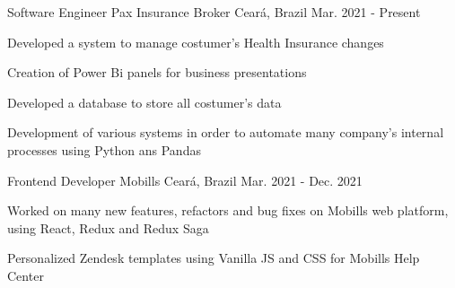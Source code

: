 

\begin{cventries}

  \cventry
    {Software Engineer} %
    {Pax Insurance Broker} %
    {Ceará, Brazil} %
    {Mar. 2021 - Present} %
    {
      \begin{cvitems} %
        \item {Developed a system to manage costumer's Health Insurance changes}
        \item {Creation of Power Bi panels for business presentations}
        \item {Developed a database to store
        all costumer's data}
        \item {Development of various systems in order to automate many company's internal processes using Python ans Pandas}
      \end{cvitems}
    }

  \cventry
    {Frontend Developer} %
    {Mobills} %
    {Ceará, Brazil} %
    {Mar. 2021 - Dec. 2021} %
    {
      \begin{cvitems} %
        \item {Worked on many new features,
        refactors and bug fixes on Mobills
        web platform, using React, Redux
        and Redux Saga}
        \item {Personalized Zendesk templates
        using Vanilla JS and CSS for
        Mobills Help Center}
      \end{cvitems}
    }

\end{cventries}

